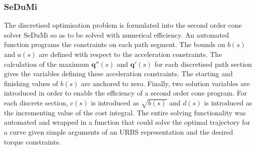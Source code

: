 \subsubsection{SeDuMi}

The discretised optimisation problem is formulated into the second order cone solver SeDuMi so as to be solved with numerical efficiency. An automated function programs the constraints on each path segment. The bounds on $b(s)$ and $a(s)$ are defined with respect to the acceleration constraints. The calculation of the maximum $\textbf{q}''(s)$ and $\textbf{q}'(s)$ for each discretised path section gives the variables defining these acceleration constraints. The starting and finishing values of $b(s)$ are anchored to zero. Finally, two solution variables are introduced in order to enable the efficiency of a second order cone program. For each discrete section, $c(s)$ is introduced as $\sqrt{b(s)}$ and $d(s)$ is introduced as the incrementing value of the cost integral.
The entire solving functionality was automated and wrapped in a function that could solve the optimal trajectory for a curve  given simple arguments of an URBS representation and the desired torque constraints.
